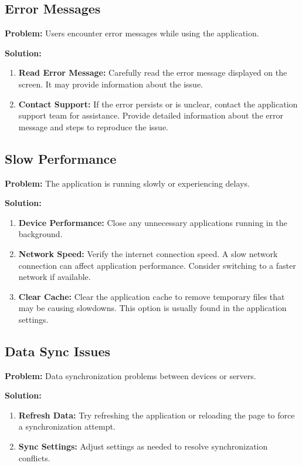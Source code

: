 \documentclass[12pt]{article}
\begin{document}
\subsection{Error Messages}

\textbf{Problem:} Users encounter error messages while using the application.

\textbf{Solution:}
\begin{enumerate}
    \item \textbf{Read Error Message:} Carefully read the error message displayed on the screen. It may provide information about the issue.
 
    \item \textbf{Contact Support:} If the error persists or is unclear, contact the application support team for assistance. Provide detailed information about the error message and steps to reproduce the issue.
\end{enumerate}

\subsection{Slow Performance}

\textbf{Problem:} The application is running slowly or experiencing delays.

\textbf{Solution:}
\begin{enumerate}
    \item \textbf{Device Performance:}  Close any unnecessary applications running in the background.
    \item \textbf{Network Speed:} Verify the internet connection speed. A slow network connection can affect application performance. Consider switching to a faster network if available.
    \item \textbf{Clear Cache:} Clear the application cache to remove temporary files that may be causing slowdowns. This option is usually found in the application settings.
\end{enumerate}

\subsection{Data Sync Issues}

\textbf{Problem:} Data synchronization problems between devices or servers.

\textbf{Solution:}
\begin{enumerate}
    \item \textbf{Refresh Data:} Try refreshing the application or reloading the page to force a synchronization attempt.

    \item \textbf{Sync Settings:}  Adjust settings as needed to resolve synchronization conflicts.
\end{enumerate}
\end{document}
